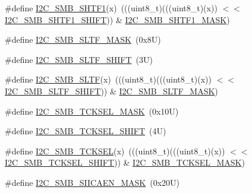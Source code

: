 \begin{DoxyCompactItemize}
\item 
\#define \mbox{\hyperlink{group___i2_c___register___masks_ga1f9be41fbf54c218799bc986a2be0d3f}{I2\+C\+\_\+\+S\+M\+B\+\_\+\+S\+H\+T\+F1}}(x)~(((uint8\+\_\+t)(((uint8\+\_\+t)(x)) $<$$<$ \mbox{\hyperlink{group___i2_c___register___masks_ga27af2fe0000903e76be422f1b0d0d277}{I2\+C\+\_\+\+S\+M\+B\+\_\+\+S\+H\+T\+F1\+\_\+\+S\+H\+I\+FT}})) \& \mbox{\hyperlink{group___i2_c___register___masks_gaefffa6f332bf3bd19ea55db0d1848546}{I2\+C\+\_\+\+S\+M\+B\+\_\+\+S\+H\+T\+F1\+\_\+\+M\+A\+SK}})
\item 
\#define \mbox{\hyperlink{group___i2_c___register___masks_ga19239e39699b975c050e78098f1160be}{I2\+C\+\_\+\+S\+M\+B\+\_\+\+S\+L\+T\+F\+\_\+\+M\+A\+SK}}~(0x8\+U)
\item 
\#define \mbox{\hyperlink{group___i2_c___register___masks_ga158639264e921e0cdc2d1c531c0481be}{I2\+C\+\_\+\+S\+M\+B\+\_\+\+S\+L\+T\+F\+\_\+\+S\+H\+I\+FT}}~(3\+U)
\item 
\#define \mbox{\hyperlink{group___i2_c___register___masks_gacdc4b251c48d9987a5183ac3b0e6b0c1}{I2\+C\+\_\+\+S\+M\+B\+\_\+\+S\+L\+TF}}(x)~(((uint8\+\_\+t)(((uint8\+\_\+t)(x)) $<$$<$ \mbox{\hyperlink{group___i2_c___register___masks_ga158639264e921e0cdc2d1c531c0481be}{I2\+C\+\_\+\+S\+M\+B\+\_\+\+S\+L\+T\+F\+\_\+\+S\+H\+I\+FT}})) \& \mbox{\hyperlink{group___i2_c___register___masks_ga19239e39699b975c050e78098f1160be}{I2\+C\+\_\+\+S\+M\+B\+\_\+\+S\+L\+T\+F\+\_\+\+M\+A\+SK}})
\item 
\#define \mbox{\hyperlink{group___i2_c___register___masks_ga7a0dba773688ec97b8f2a6306085c136}{I2\+C\+\_\+\+S\+M\+B\+\_\+\+T\+C\+K\+S\+E\+L\+\_\+\+M\+A\+SK}}~(0x10\+U)
\item 
\#define \mbox{\hyperlink{group___i2_c___register___masks_ga07c36bbad07617ae5ae27911d3b00290}{I2\+C\+\_\+\+S\+M\+B\+\_\+\+T\+C\+K\+S\+E\+L\+\_\+\+S\+H\+I\+FT}}~(4\+U)
\item 
\#define \mbox{\hyperlink{group___i2_c___register___masks_gaf627ce545902545010418f2bb533794c}{I2\+C\+\_\+\+S\+M\+B\+\_\+\+T\+C\+K\+S\+EL}}(x)~(((uint8\+\_\+t)(((uint8\+\_\+t)(x)) $<$$<$ \mbox{\hyperlink{group___i2_c___register___masks_ga07c36bbad07617ae5ae27911d3b00290}{I2\+C\+\_\+\+S\+M\+B\+\_\+\+T\+C\+K\+S\+E\+L\+\_\+\+S\+H\+I\+FT}})) \& \mbox{\hyperlink{group___i2_c___register___masks_ga7a0dba773688ec97b8f2a6306085c136}{I2\+C\+\_\+\+S\+M\+B\+\_\+\+T\+C\+K\+S\+E\+L\+\_\+\+M\+A\+SK}})
\item 
\#define \mbox{\hyperlink{group___i2_c___register___masks_gae54c99ffbc7df399f532cf0ddea2b43a}{I2\+C\+\_\+\+S\+M\+B\+\_\+\+S\+I\+I\+C\+A\+E\+N\+\_\+\+M\+A\+SK}}~(0x20\+U)
$$
\end{DoxyCompactItemize}
